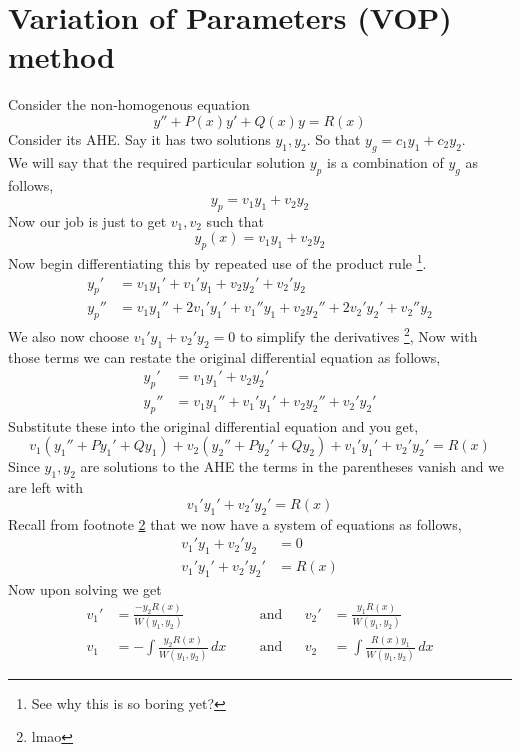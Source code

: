 \documentclass[oneside,11pt,pdftex,final]{book}%
\numberwithin{equation}{section}
\numberwithin{section}{chapter}
\numberwithin{equation}{chapter}
\begin{document}
\section{Variation of Parameters (VOP) method}
Consider the non-homogenous equation
\[ y''+P(x)y'+Q(x)y=R(x) \]
Consider its AHE. Say it has two solutions $ y_1, y_2$. So that $ y_g= c_1y_1+c_2y_2$.\\
We will say that the required particular solution $ y_p $ is a combination of $ y_g $ as follows,\[ y_p=v_1 y_1+v_2y_2 \]
Now our job is just to get $ v_1,v_2 $ such that
\[ y_p(x)=v_1y_1+v_2y_2 \]
Now begin differentiating this by repeated use of the product rule \footnote{See why this is so boring yet?}.
\begin{align*}
	y_p'&=v_1y_1'+v_1'y_1+v_2y_2'+v_2'y_2\\
	y_p''&=v_1y_1''+2v_1'y_1'+v_1''y_1+v_2y_2''+2v_2'y_2'+v_2''y_2
\end{align*}
We also now choose $ v_1'y_1+v_2'y_2=0 $ to simplify the derivatives \footnote{\label{lmao}lmao},
Now with those terms we can restate the original differential equation as follows, 
\begin{align*}
	y_p'&=v_1y_1'+v_2y_2'\\
	y_p''&=v_1y_1''+v_1'y_1'+v_2y_2''+v_2'y_2'
\end{align*}
Substitute these into the original differential equation and you get,
\[ v_1(y_1''+Py_1'+Qy_1)+v_2(y_2''+Py_2'+Qy_2)+v_1'y_1'+v_2'y_2'=R(x) \]
Since $ y_1, y_2 $ are solutions to the AHE the terms in the parentheses vanish and we are left with
\[ v_1'y_1'+v_2'y_2'=R(x) \]
Recall from footnote \ref{lmao} that we now have a system of equations as follows,
\begin{align*}
	v_1'y_1+v_2'y_2&=0\\
	v_1'y_1'+v_2'y_2'&=R(x)
\end{align*}
Now upon solving we get 
\begin{align*}
	v_1' &= \frac{-y_2R(x)}{W(y_1,y_2)} && &\text{and} && v_2' &= \frac{y_1R(x)}{W(y_1,y_2)}\\
	v_1 &= -\int \frac{y_2R(x)}{W(y_1,y_2)}\, dx && &\text{and} && v_2 &= \int \frac{R(x)y_1}{W(y_1,y_2)}\, dx
\end{align*}
\end{document}
